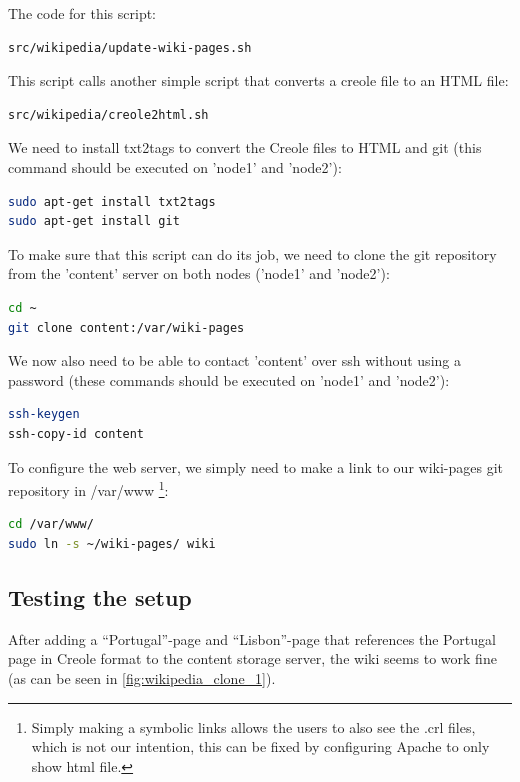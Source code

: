 \documentclass[12pt]{report}
\begin{document}
The code for this script:
 \begin{lstlisting}[language=bash]
src/wikipedia/update-wiki-pages.sh
\end{lstlisting}
This script calls another simple script that converts a creole file to
an HTML file:
 \begin{lstlisting}[language=bash]
src/wikipedia/creole2html.sh
\end{lstlisting}

We need to install txt2tags to convert the Creole files to HTML and git (this
command should be executed on 'node1' and 'node2'):
\begin{lstlisting}[language=bash]
sudo apt-get install txt2tags
sudo apt-get install git
\end{lstlisting}

To make sure that this script can do its job, we need to clone the git
repository from the 'content' server on both nodes ('node1' and 'node2'):
 \begin{lstlisting}[language=bash]
cd ~
git clone content:/var/wiki-pages
\end{lstlisting}
We now also need to be able to contact 'content' over ssh without using
a password (these commands should be executed on 'node1' and 'node2'):
\begin{lstlisting}[language=bash]
ssh-keygen
ssh-copy-id content
\end{lstlisting}

To configure the web server, we simply need to make a link to our
wiki-pages git repository in /var/www \footnote{Simply making a
  symbolic links allows the users to also see the .crl files, which is
  not our intention, this can be fixed by configuring Apache to only
  show html file.}:
\begin{lstlisting}[language=bash]
cd /var/www/
sudo ln -s ~/wiki-pages/ wiki
\end{lstlisting}

\subsection{Testing the setup}
After adding a ``Portugal''-page and ``Lisbon''-page that references
the Portugal page in Creole format to the content storage server, the
wiki seems to work fine (as can be seen in \ref{fig:wikipedia_clone_1}).
\end{document}
